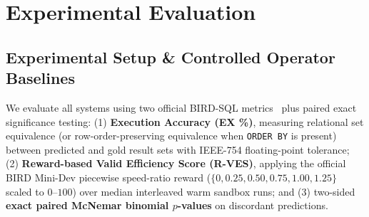 \documentclass[10pt,twocolumn]{article}
\begin{document}



\section{Experimental Evaluation}
\label{sec:experiments}

\subsection{Experimental Setup \& Controlled Operator Baselines}
We evaluate all systems using two official BIRD-SQL metrics~\cite{li2023bird} plus paired exact significance testing: (1) \textbf{Execution Accuracy (EX \%)}, measuring relational set equivalence (or row-order-preserving equivalence when \texttt{ORDER BY} is present) between predicted and gold result sets with IEEE-754 floating-point tolerance; (2) \textbf{Reward-based Valid Efficiency Score (R-VES)}, applying the official BIRD Mini-Dev piecewise speed-ratio reward ($\{0, 0.25, 0.50, 0.75, 1.00, 1.25\}$ scaled to $0\text{--}100$) over median interleaved warm sandbox runs; and (3) two-sided \textbf{exact paired McNemar binomial $p$-values} on discordant predictions.
\end{document}
